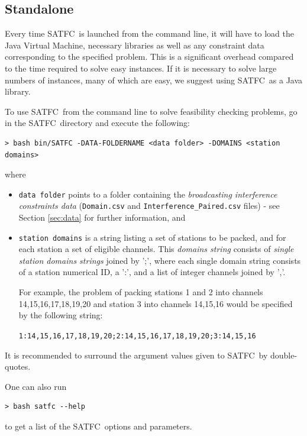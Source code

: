 \documentclass[
10pt, %
letterpaper, %
oneside, %
headinclude,footinclude, %
BCOR5mm, %
needspace, %
]{scrartcl}
\newcommand{\SATFC}{\textsc{SATFC}~}
\begin{document}
\subsection{Standalone}\label{sec:standalone}

\begin{fwarning}
Every time \SATFC is launched from the command line, it will have to load the Java Virtual Machine, necessary libraries as well as any constraint data corresponding to the specified problem. This is a significant overhead compared to the time required to solve easy instances. If it is necessary to solve large numbers of instances, many of which are easy, we suggest using \SATFC as a Java library.
\end{fwarning}

To use \SATFC from the command line to solve feasibility checking problems, go in the \SATFC directory and execute the following:
\begin{lstlisting}[style=Bash]
> bash bin/SATFC -DATA-FOLDERNAME <data folder> -DOMAINS <station domains>
\end{lstlisting}
where 
\begin{itemize}
\item \texttt{data folder} points to a folder containing the \emph{broadcasting interference constraints data} (\texttt{Domain.csv} and \texttt{Interference\_Paired.csv} files) - see Section \ref{sec:data} for further information, and
\item \texttt{station domains} is a string listing a set of stations to be packed, and for each station a set of eligible channels. This \emph{domains string} consists of \emph{single station domains strings} joined by ';', where each single domain string consists of a station numerical ID, a ':', and a list of integer channels joined by ','. 

For example, the problem of packing stations 1 and 2 into channels 14,15,16,17,18,19,20 and station 3 into channels 14,15,16 would be specified by the following string:
\begin{center}
\texttt{1:14,15,16,17,18,19,20;2:14,15,16,17,18,19,20;3:14,15,16}
\end{center}
\end{itemize}
It is recommended to surround the argument values given to \SATFC by double-quotes.

One can also run
\begin{lstlisting}[style=Bash]
> bash satfc --help
\end{lstlisting}
to get a list of the \SATFC options and parameters.
\end{document}
